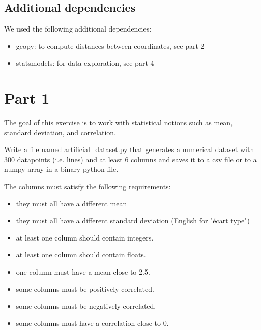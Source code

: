 \documentclass[10pt, a4paper]{article}
\begin{document}
\subsection*{Additional dependencies}

We used the following additional dependencies:

\begin{itemize}
    \item geopy: to compute distances between coordinates, see part 2
    \item statsmodels: for data exploration, see part 4
\end{itemize}

\newpage


\section*{Part 1}

\begin{Problem}
    The goal of this exercise is to work with statistical notions such as mean, standard deviation, and correlation.

    Write a file named artificial\_dataset.py that generates a numerical dataset with 300 datapoints (i.e. lines) and at least 6 columns and saves it to a csv file or to a numpy array in a binary python file.

    The columns must satisfy the following requirements:
    \begin{itemize}
        \item they must all have a different mean
        \item they must all have a different standard deviation (English for "écart type")
        \item at least one column should contain integers.
        \item at least one column should contain floats.
        \item one column must have a mean close to 2.5.
        \item some columns must be positively correlated.
        \item some columns must be negatively correlated.
        \item some columns must have a correlation close to 0.
    \end{itemize}
\end{Problem}
\end{document}
